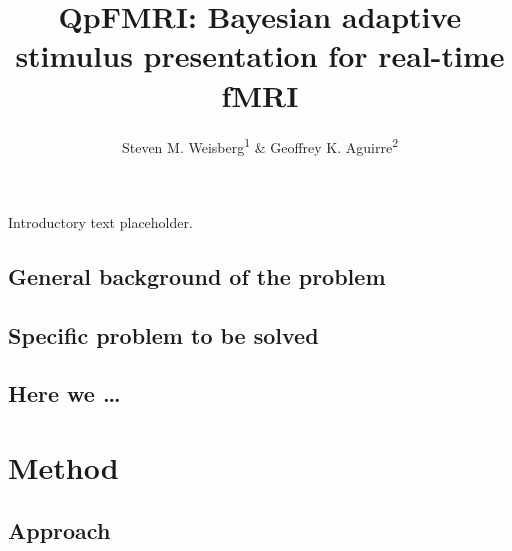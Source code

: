 \documentclass[
  english,
  man,floatsintext]{apa6}
\title{QpFMRI: Bayesian adaptive stimulus presentation for real-time fMRI}
\author{Steven M. Weisberg\textsuperscript{1} \& Geoffrey K. Aguirre\textsuperscript{2}}
\date{}
\affiliation{\vspace{0.5cm}\textsuperscript{1} University of Florida\\\textsuperscript{2} University of Pennsylvania}
\begin{document}
\maketitle

Introductory text placeholder.

\hypertarget{general-background-of-the-problem}{%
\subsection{General background of the problem}\label{general-background-of-the-problem}}

\hypertarget{specific-problem-to-be-solved}{%
\subsection{Specific problem to be solved}\label{specific-problem-to-be-solved}}

\hypertarget{here-we}{%
\subsection{Here we \ldots{}}\label{here-we}}

\hypertarget{method}{%
\section{Method}\label{method}}

\hypertarget{approach}{%
\subsection{Approach}\label{approach}}
\end{document}
